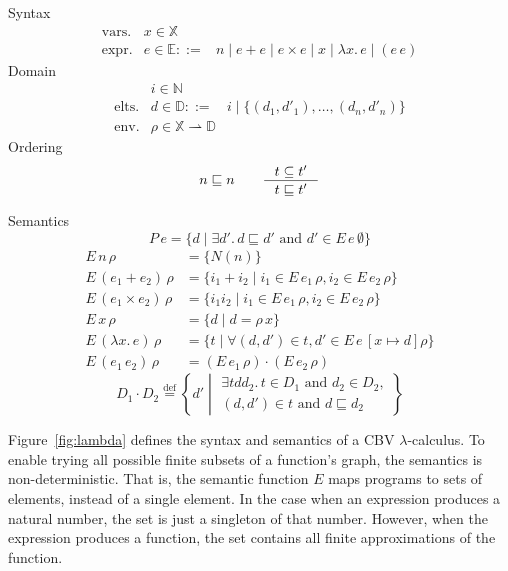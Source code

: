 \documentclass{tufte-handout}
\newcommand{\LAM}[1]{\lambda #1.\,}
\newcommand{\pto}[0]{\rightharpoonup}
\begin{document}
\begin{figure*}
\begin{minipage}{0.5\textwidth}
\noindent Syntax
\[
\begin{array}{lrl}
 \text{vars.} & x \in \mathbb{X}\\
 \text{expr.}& e \in\mathbb{E} ::=& n \mid e + e \mid e \times e \mid x \mid \LAM{x} e \mid (e \, e)
\end{array}
\]
Domain
\[
\begin{array}{lrl}
               & i \in \mathbb{N} \\
  \text{elts.} & d \in \mathbb{D} ::= &i \mid \{ (d_1,d'_1), \ldots, (d_n,d'_n) \} \\
  \text{env.} & \rho \in  \mathbb{X} \pto \mathbb{D} 
\end{array}
\]
Ordering
\[
   n \sqsubseteq n \qquad 
   \inference{t \subseteq t'}{t \sqsubseteq t'}
\]
\end{minipage}
\begin{minipage}{0.5\textwidth}
Semantics
\[
  P\,e = \{ d \mid \exists d'.\, d \sqsubseteq d' 
               \text{ and } d' \in E\,e\,\emptyset\}
\]
\begin{align*}
  E\, n \, \rho & = \{ N(n) \} \\
  E\, (e_1 + e_2) \, \rho & = \{ i_1 + i_2 \mid i_1 \in E\,e_1\,\rho, 
                                    i_2 \in E\,e_2\,\rho \} \\
  E\, (e_1 \times e_2) \, \rho & = \{ i_1 i_2 \mid i_1 \in E\,e_1\,\rho, 
                                    i_2 \in E\,e_2\,\rho \} \\
  E\, x \,\rho &= \{ d \mid d = \rho\,x \} \\
  E\, (\LAM{x}e)\,\rho &= \{ t \mid
   \forall (d,d') \in t, d' \in E\,e\,[x\mapsto d]\rho \} \\
  E\, (e_1\,e_2)\,\rho &= (E\,e_1\,\rho) \cdot (E\,e_2\,\rho)
\end{align*}
\[
  D_1 \cdot D_2 \overset{\mathrm{def}}{=}
  \left\{ d' \middle|
  \begin{array}{l}\exists t d d_2.\, t \in D_1 \text{ and }  d_2 \in D_2, \\
    (d,d') \in t \text{ and } d \sqsubseteq d_2
  \end{array}
  \right\}
\]
\end{minipage}
\caption{$\lambda$-calculus}
\label{fig:lambda}
\end{figure*}

Figure~\ref{fig:lambda} defines the syntax and semantics of a CBV
$\lambda$-calculus. To enable trying all possible finite subsets of a
function's graph, the semantics is non-deterministic. That is, the
semantic function $E$ maps programs to sets of elements, instead of a
single element. In the case when an expression produces a natural
number, the set is just a singleton of that number. However, when the
expression produces a function, the set contains all finite
approximations of the function.
\end{document}

